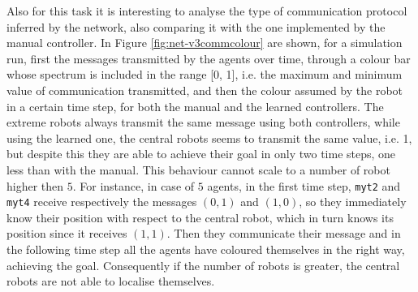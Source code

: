 Also for this task it is interesting to analyse the type of communication protocol 
inferred by the network, also comparing it with the one implemented by the 
manual controller. In Figure \ref{fig:net-v3commcolour} are shown, for a 
simulation run, first the messages transmitted by the agents over time, through a 
colour bar whose spectrum is included in the range [0, 1], i.e. the maximum and 
minimum value of communication transmitted, and then the colour assumed by 
the robot in a certain time step, for both the manual and the learned controllers.
The extreme robots always transmit the same message using both controllers, 
while using the learned one, the central robots seems to transmit the same value, 
i.e. 1, but despite this they are able to achieve their goal in only two time steps, 
one less than with the manual. This behaviour cannot scale to a number of robot 
higher then $5$. For instance, in case of $5$ agents, in the first time step, 
\texttt{myt2} and \texttt{myt4} receive respectively the messages $(0, 1)$ and $(1, 
0)$, so they immediately know their position with respect to the central robot, 
which in turn knows its position since it receives $(1, 1)$. Then they communicate 
their message and in the following time step all the agents have coloured 
themselves in the right way, achieving the goal.
Consequently if the number of robots is greater, the central robots are not able to 
localise themselves. 
